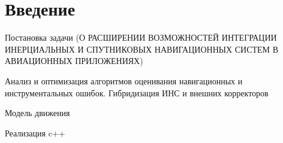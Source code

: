 
\chapter*{\centering\large{Введение}}

 \label{sec:Chapter0} 


\begin{onehalfspace}
Постановка задачи (О РАСШИРЕНИИ ВОЗМОЖНОСТЕЙ ИНТЕГРАЦИИ ИНЕРЦИАЛЬНЫХ
И СПУТНИКОВЫХ НАВИГАЦИОННЫХ СИСТЕМ В АВИАЦИОННЫХ
ПРИЛОЖЕНИЯХ)

Анализ и оптимизация алгоритмов оценивания навигационных и инструментальных ошибок. Гибридизация ИНС и внешних корректоров

Модель движения

Реализация c++




	
\end{onehalfspace}
		
\newpage